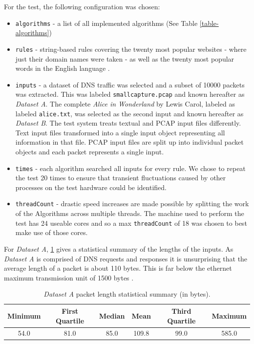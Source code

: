 \documentclass[11pt]{article}
\begin{document}
For the test, the following configuration was chosen:
\begin{itemize}
  \item \texttt{algorithms} - a list of all implemented algorithms (See Table \ref{table-algorithms}) 
  \item \texttt{rules} - string-based rules covering the twenty most popular websites \citep{alexa2016} - where just their domain names were taken - as well as the twenty most popular words in the English language \citep{oed2016}.
  \item \texttt{inputs} - a dataset of DNS traffic was selected and a subset of 10000 packets was extracted. This was labeled \texttt{smallcapture.pcap} and known hereafter as \textit{Dataset A}. The complete \textit{Alice in Wonderland} by Lewis Carol, labeled as labeled \texttt{alice.txt}, was selected as the second input and known hereafter as \textit{Dataset B}. The test system treats textual and PCAP input files differently. Text input files transformed into a single input object representing all information in that file. PCAP input files are split up into individual packet objects and each packet represents a single input.
  \item \texttt{times} - each algorithm searched all inputs for every rule. We chose to repeat the test 20 times to ensure that transient fluctuations caused by other processes on the test hardware could be identified.
  \item \texttt{threadCount} - drastic speed increases are made possible by splitting the work of the Algorithms across multiple threads. The machine used to perform the test has 24 useable cores and so a max \texttt{threadCount} of 18 was chosen to best make use of those cores. 
\end{itemize}


For \textit{Dataset A}, \ref{table-inputsummary} gives a statistical summary of the lengths of the inputs. As \textit{Dataset A} is comprised of DNS requests and responses it is unsurprising that the average length of a packet is about 110 bytes. This is far below the ethernet maximum transmission unit of 1500 bytes \citep{rfc894}. 

\begin{table}[!htb]
  \centering
  \begin{tabular}{cccccc}
    Minimum & First Quartile & Median & Mean & Third Quartile & Maximum \\
    \hline
    54.0 & 81.0 & 85.0 & 109.8 & 99.0 & 585.0
  \end{tabular}
  \caption{\textit{Dataset A} packet length statistical summary (in bytes).}
  \label{table-inputsummary}
\end{table}
\end{document}
